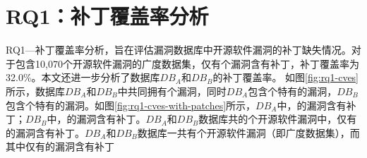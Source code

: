 \section{RQ1：补丁覆盖率分析}\label{sec:coverage}
RQ1---补丁覆盖率分析，旨在评估漏洞数据库中开源软件漏洞的补丁缺失情况。对于包含10,070个开源软件漏洞的广度数据集，仅有个漏洞含有补丁，补丁覆盖率为32.0\%。本文还进一步分析了数据库$DB_A$和$DB_B$的补丁覆盖率。
如图\ref{fig:rq1-cves}所示，数据库$DB_A$和$DB_B$中共同拥有个漏洞，同时$DB_A$包含个特有的漏洞，$DB_B$包含个特有的漏洞。如图\ref{fig:rq1-cves-with-patches}所示，$DB_A$中，的漏洞含有补丁；$DB_B$中，的漏洞含有补丁。$DB_A$和$DB_B$数据库共的个开源软件漏洞中，仅有的漏洞含有补丁。$DB_A$和$DB_B$数据库一共有个开源软件漏洞（即广度数据集），而其中仅有的漏洞含有补丁
